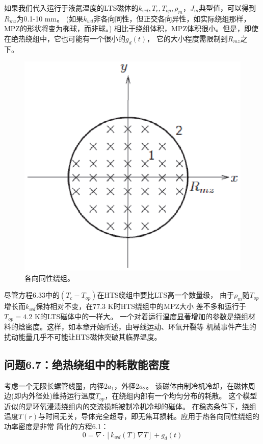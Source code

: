 如果我们代入运行于液氦温度的LTS磁体的$k_{wd},T_c,T_{op},\rho_m，J_m$典型值，可以得到$R_{mz}$为0.1-10 mm。
(如果$k_{wd}$非各向同性，但正交各向异性，如实际绕组那样，MPZ的形状将变为椭球，而非球。)
相比于绕组体积，MPZ体积很小。但是，即使在绝热绕组中，它也可能有一个很小的$g_d(t)$，
它的大小程度需限制到$R_{mz}$之下。

\begin{figure}[htbp]
	\centering
	\includegraphics[scale=0.7]{chpt6/figs/fig6.21.eps}
	\caption{各向同性绕组。}
\end{figure}

尽管方程6.33中的$(T_c−T_{op})$在HTS绕组中要比LTS高一个数量级，
由于$\rho_m$随$T_{op}$增长而$k_{wd}$保持相对不变，在77.3 K时HTS绕组中的MPZ大小
差不多和运行于$T_{op}=4.2$ K的LTS磁体中的一样大。
一个对着运行温度显著增加的参数是绕组材料的焓密度。这样，如本章开始所述，由导线运动、环氧开裂等
机械事件产生的扰动能量几乎不可能让HTS磁体突破其临界温度。

\subsection{问题6.7：绝热绕组中的耗散能密度}
考虑一个无限长螺管线圈，内径$2a_1$，外径$2a_2$。
该磁体由制冷机冷却，在磁体周边(即内外径处)维持运行温度$T_{op}$，在绕组内部有一个均匀分布的耗散。
这个模型近似的是环氧浸渍绕组内的交流损耗被制冷机冷却的磁体。
在稳态条件下，绕组温度$T(r)$与时间无关，导体完全超导，即无焦耳损耗。应用于热各向同性绕组的功率密度是非常
简化的方程6.1：
\begin{equation}%
0=\nabla\cdot[k_{wd}(T)\nabla T]+g_d(t)
\end{equation}

